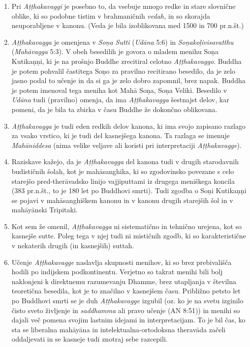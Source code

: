\begin{enumerate}
\def\labelenumi{\arabic{enumi}.}
\item
  Pri \emph{Aṭṭhakavaggi} je posebno to, da vsebuje mnogo redke in stare
  slovnične oblike, ki so podobne tistim v brahmaničnih \emph{vedah,} in
  so skorajda neuporabljene v kanonu. (Veda je bila izoblikovana med
  1500 in 700 pr.n.št.)
\item
  \emph{Aṭṭhakavagga} je omenjena v
  \emph{Soṇa Sutti} (\emph{Udāna} 5:6) in \emph{Soṇakoḷivisavatthu}
  (\emph{Mahāvagga} 5:3). V obeh besedilih je govora o mladem menihu
  Soṇa Kutikaṇṇi, ki je na prošnjo Buddhe zrecitiral celotno
  \emph{Aṭṭhakavaggo}. Buddha je potem pohvalil častitega Soṇo za
  pravilno recitirano besedilo, da je zelo jasno podal to učenje in da
  si ga je zelo dobro zapomnil, brez napak. Buddha je potem imenoval
  tega meniha kot Mahā Soṇa, Soṇa Veliki. Besedilo v \emph{Udāna} tudi
  (pravilno) omenja, da ima \emph{Aṭṭhakavagga} šestnajst delov, kar
  pomeni, da je bila ta zbirka v času Buddhe že dokončno oblikovana.
\item
  \emph{Aṭṭhakavagga} je tudi eden redkih delov kanona, ki ima svojo
  zapisano razlago za vsako vrstico, ki je tudi del kasnejšega kanona.
  Ta razlaga se imenuje \emph{Mahāniddesa} (nima velike veljave ali
  koristi pri interpretaciji \emph{Aṭṭhakavagge}).
\item
  Raziskave kažejo, da je \emph{Aṭṭhakavagga} del kanona tudi v drugih
  starodavnih budističnih šolah, kot je mahāsanghika, ki so zgodovinsko
  povezane s celo starejšo pred-therāvadsko linijo vajjiputtami iz
  drugega meniškega koncila (383 pr.n.št., to je 180 let po Buddhovi
  smrti). Tudi zgodba o Soṇi Kutikaṇṇi se pojavi v mahāsanghiškem kanonu
  in v kanonu drugih starejših šol in v mahāyānski Tripitaki.
\item
  Kot sem že omenil, \emph{Aṭṭhakavagga} ni sistematično in tehnično
  urejena, kot so kasnejše sutte. Poleg tega v njej tudi ni mističnih
  zgodb, ki so karakteristične v nekaterih drugih (in kasnejših) suttah.
\item
  Učenje \emph{Aṭṭhakavagge} naslavlja skupnosti menihov, ki so brez
  prebivališča hodili po indijskem podkontinentu. Verjetno so takrat
  menihi bili bolj naklonjeni k direktnemu razumevanju Dhamme, brez
  utapljanja v številna teoretična besedila, kot je to značilno v
  kasnejšem času. Približno petsto let po Buddhovi smrti se je duh
  \emph{Aṭṭhakavagge} izgubil (oz. ko je na svetu izginilo čisto sveto
  življenje in \emph{saddhamma} ali pravo učenje (AN 8:51)) in menihi so
  dajali več pomena svojim lastnim idejami in interpretacijam. To je bil
  čas, ko sta se liberalna mahāyāna in intelektualna-ortodoksna
  theravāda začeli oddaljevati in se kasneje tudi znotraj sebe
  razcepili.
\end{enumerate}

